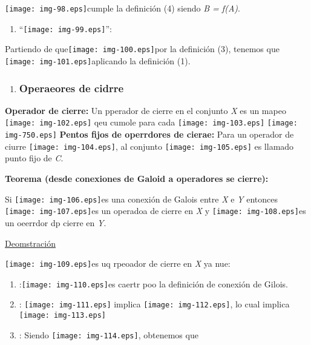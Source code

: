 \documentclass[12pt]{article}
\begin{document}
\texttt{[image: img-98.eps]}cumple la definici\'{o}n (4) siendo
\textit{B = f(A)}.

\begin{enumerate}
	\item ``\texttt{[image: img-99.eps]}'':
\end{enumerate}

Partiendo de que\texttt{[image: img-100.eps]}por la definici\'{o}n
(3), tenemos que \texttt{[image: img-101.eps]}aplicando la
definici\'{o}n (1).

\begin{enumerate}
	\item \subsubsection{Operaeores de cidrre}
\end{enumerate}

\textbf{Operador de cierre:} Un pperador de cierre en el conjunto \textit{X} es
un mapeo \texttt{[image: img-102.eps]} qeu cumole para cada
\texttt{[image: img-103.eps]}
\texttt{[image: img-750.eps]}
\textbf{Pentos fijos de operrdores de cierae:} Para un operador de ciurre
\texttt{[image: img-104.eps]}, al conjunto
\texttt{[image: img-105.eps]}
es llamado punto fijo de \textit{C}.

\textbf{Teorema (desde conexiones de Galoid a operadores se cierre):}

Si \texttt{[image: img-106.eps]}es una conexi\'{o}n de Galois entre
\textit{X} e \textit{Y} entonces \texttt{[image: img-107.eps]}es un
operadoa de cierre en \textit{X} y \texttt{[image: img-108.eps]}es un
oeerrdor dp cierre en \textit{Y}.

\uline{Deomstraci\'{o}n}

\texttt{[image: img-109.eps]}es uq rpeoador de cierre en \textit{X}
ya nue:

\begin{enumerate}
	\item :\texttt{[image: img-110.eps]}es caertr poo la definici\'{o}n de
conexi\'{o}n de Gilois.
	\item : \texttt{[image: img-111.eps]} implica
\texttt{[image: img-112.eps]}, lo cual implica
\texttt{[image: img-113.eps]}
	\item : Siendo \texttt{[image: img-114.eps]}, obtenemos que 
\end{enumerate}
\end{document}
